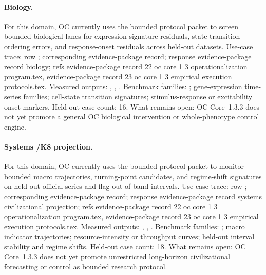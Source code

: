 \paragraph{Biology.}
For this domain, OC currently uses the bounded protocol packet to screen bounded biological lanes for expression-signature residuals, state-transition ordering errors, and response-onset residuals across held-out datasets.
Use-case trace: row ; corresponding evidence-package record; \allowbreak response evidence-package record biology; \allowbreak refs evidence-package record 22 oc core 1 3 operationalization program.tex, \allowbreak evidence-package record 23 oc core 1 3 empirical execution protocols.tex.
Measured outputs: , , .
Benchmark families: ; gene-expression time-series families; cell-state transition signatures; stimulus-response or excitability onset markers.
Held-out case count: 16.
What remains open: OC Core~1.3.3 does not yet promote a general OC biological intervention or whole-phenotype control engine.

\paragraph{Systems /\allowbreak K8 projection.}
For this domain, OC currently uses the bounded protocol packet to monitor bounded macro trajectories, turning-point candidates, and regime-shift signatures on held-out official series and flag out-of-band intervals.
Use-case trace: row ; corresponding evidence-package record; \allowbreak response evidence-package record systems civilizational projection; \allowbreak refs evidence-package record 22 oc core 1 3 operationalization program.tex, \allowbreak evidence-package record 23 oc core 1 3 empirical execution protocols.tex.
Measured outputs: , , .
Benchmark families: ; macro indicator trajectories; resource-intensity or throughput curves; held-out interval stability and regime shifts.
Held-out case count: 18.
What remains open: OC Core~1.3.3 does not yet promote unrestricted long-horizon civilizational forecasting or control as bounded research protocol.

